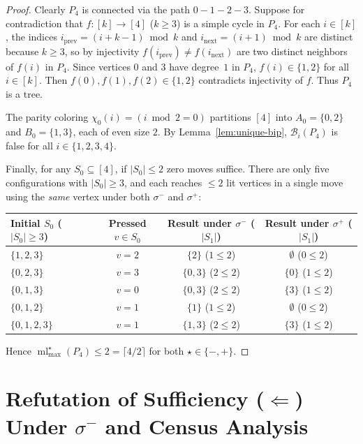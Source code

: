 \documentclass[11pt,a4paper]{article}
\theoremstyle{definition}
\newcommand{\ml}{\operatorname{ml}}
\newcommand{\ceilhalf}[1]{\lceil #1 / 2 \rceil}
\begin{document}
\begin{proof}
Clearly $P_4$ is connected via the path $0 - 1 - 2 - 3$. Suppose for contradiction
that $f : [k] \to [4]$ ($k \ge 3$) is a simple cycle in $P_4$. For each $i \in [k]$,
the indices $i_{\mathrm{prev}} = (i + k - 1) \bmod k$ and $i_{\mathrm{next}} = (i + 1) \bmod k$
are distinct because $k \ge 3$, so by injectivity $f(i_{\mathrm{prev}}) \neq f(i_{\mathrm{next}})$
are two distinct neighbors of $f(i)$ in $P_4$. Since vertices $0$ and $3$ have degree~$1$
in $P_4$, $f(i) \in \{1, 2\}$ for all $i \in [k]$. Then $f(0), f(1), f(2) \in \{1, 2\}$
contradicts injectivity of $f$. Thus $P_4$ is a tree.

The parity coloring $\chi_0(i) = (i \bmod 2 = 0)$ partitions $[4]$ into
$A_0 = \{0, 2\}$ and $B_0 = \{1, 3\}$, each of even size $2$. By
Lemma~\ref{lem:unique-bip}, $\mathcal{B}_i(P_4)$ is false for all $i \in \{1,2,3,4\}$.

Finally, for any $S_0 \subseteq [4]$, if $|S_0| \le 2$ zero moves suffice. There are
only five configurations with $|S_0| \ge 3$, and each reaches $\le 2$ lit vertices
in a single move using the \emph{same} vertex under both $\sigma^-$ and $\sigma^+$:
\begin{center}
\small
\begin{tabular}{@{}lccc@{}}
\toprule
Initial $S_0$ ($|S_0| \ge 3$) & Pressed $v \in S_0$ & Result under $\sigma^-$ ($|S_1|$) & Result under $\sigma^+$ ($|S_1|$) \\
\midrule
$\{1, 2, 3\}$ & $v = 2$ & $\{2\}$ ($1 \le 2$) & $\emptyset$ ($0 \le 2$) \\
$\{0, 2, 3\}$ & $v = 3$ & $\{0, 3\}$ ($2 \le 2$) & $\{0\}$ ($1 \le 2$) \\
$\{0, 1, 3\}$ & $v = 0$ & $\{0, 3\}$ ($2 \le 2$) & $\{3\}$ ($1 \le 2$) \\
$\{0, 1, 2\}$ & $v = 1$ & $\{1\}$ ($1 \le 2$) & $\emptyset$ ($0 \le 2$) \\
$\{0, 1, 2, 3\}$ & $v = 1$ & $\{1, 3\}$ ($2 \le 2$) & $\{3\}$ ($1 \le 2$) \\
\bottomrule
\end{tabular}
\end{center}
Hence $\ml_{\max}^\star(P_4) \le 2 = \ceilhalf{4}$ for both $\star \in \{-, +\}$.
\end{proof}

\section{Refutation of Sufficiency (\texorpdfstring{$\Longleftarrow$}{<=}) Under \texorpdfstring{$\sigma^-$}{sigma-} and Census Analysis}
\end{document}
